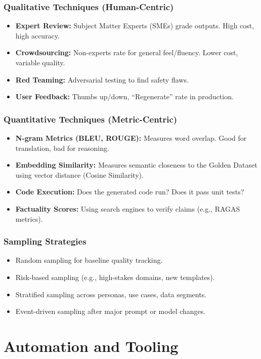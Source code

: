 \documentclass{beamer}
\begin{document}
\begin{frame}
    \frametitle{Qualitative Techniques (Human-Centric)}
    \begin{itemize}
        \item \textbf{Expert Review:} Subject Matter Experts (SMEs) grade outputs. High cost, high accuracy.
        \item \textbf{Crowdsourcing:} Non-experts rate for general feel/fluency. Lower cost, variable quality.
        \item \textbf{Red Teaming:} Adversarial testing to find safety flaws.
        \item \textbf{User Feedback:} Thumbs up/down, ``Regenerate'' rate in production.
    \end{itemize}
\end{frame}

\begin{frame}
    \frametitle{Quantitative Techniques (Metric-Centric)}
    \begin{itemize}
        \item \textbf{N-gram Metrics (BLEU, ROUGE):} Measures word overlap. Good for translation, bad for reasoning.
        \item \textbf{Embedding Similarity:} Measures semantic closeness to the Golden Dataset using vector distance (Cosine Similarity).
        \item \textbf{Code Execution:} Does the generated code run? Does it pass unit tests?
        \item \textbf{Factuality Scores:} Using search engines to verify claims (e.g., RAGAS metrics).
    \end{itemize}
\end{frame}

\begin{frame}
    \frametitle{Sampling Strategies}
    \begin{itemize}
        \item Random sampling for baseline quality tracking.
        \item Risk-based sampling (e.g., high-stakes domains, new templates).
        \item Stratified sampling across personas, use cases, data segments.
        \item Event-driven sampling after major prompt or model changes.
    \end{itemize}
\end{frame}

\section{Automation and Tooling}
\end{document}
